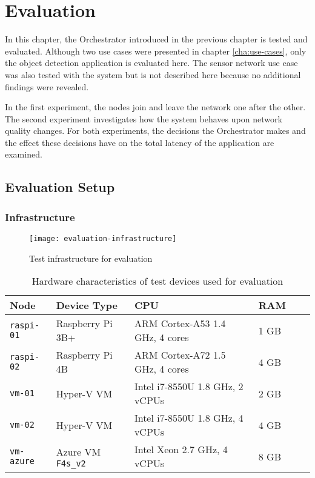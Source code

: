 \chapter{Evaluation\label{cha:evaluation}}

In this chapter, the Orchestrator introduced in the previous chapter is tested and evaluated.
Although two use cases were presented in chapter \ref{cha:use-cases}, only the object detection application is evaluated here.
The sensor network use case was also tested with the system but is not described here because no additional findings were revealed.

In the first experiment, the nodes join and leave the network one after the other.
The second experiment investigates how the system behaves upon network quality changes.
For both experiments, the decisions the Orchestrator makes and the effect these decisions have on the total latency of the application are examined.




\section{Evaluation Setup}

\subsection{Infrastructure\label{sec:eval-infrastructure}}

\begin{figure}[htb]
    \centering
    \texttt{[image: evaluation-infrastructure]}
    \caption{Test infrastructure for evaluation}
    \label{fig:evaluation-infrastructure}
\end{figure}

\begin{table}[htb]
    \centering
    \begin{tabular}{|l|l|l|l|l|l|}
    \hline
        \textbf{Node} & \textbf{Device Type} & \textbf{CPU} & \textbf{RAM} \\
         \hline
         \texttt{raspi-01} & Raspberry Pi 3B+ & ARM Cortex-A53 1.4 GHz, 4 cores & 1 GB\\
         \hline
         \texttt{raspi-02} & Raspberry Pi 4B & ARM Cortex-A72 1.5 GHz, 4 cores & 4 GB\\
         \hline
         \texttt{vm-01} & Hyper-V VM & Intel i7-8550U 1.8 GHz, 2 vCPUs & 2 GB\\
         \hline
         \texttt{vm-02} & Hyper-V VM & Intel i7-8550U 1.8 GHz, 4 vCPUs & 4 GB\\
         \hline
         \texttt{vm-azure} & Azure VM \texttt{F4s\_v2} & Intel Xeon 2.7 GHz, 4 vCPUs & 8 GB\\
         \hline
    \end{tabular}
    \caption{Hardware characteristics of test devices used for evaluation}
    \label{tab:evaluation-devices}
\end{table}


